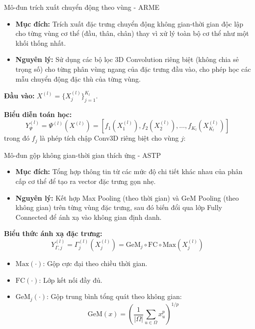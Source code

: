 \begin{frame}{Mô-đun trích xuất chuyển động theo vùng - ARME}
    \begin{itemize}
        \item \textbf{Mục đích:} Trích xuất đặc trưng chuyển động không gian-thời gian độc lập cho từng vùng cơ thể (đầu, thân, chân) thay vì xử lý toàn bộ cơ thể như một khối thống nhất.
        \item \textbf{Nguyên lý:} Sử dụng các bộ lọc 3D Convolution riêng biệt (không chia sẻ trọng số) cho từng phân vùng ngang của đặc trưng đầu vào, cho phép học các mẫu chuyển động đặc thù của từng vùng.
    \end{itemize}

    \textbf{Đầu vào:} $X^{(l)} = \{X_{j}^{(l)}\}_{j=1}^{K_l}$.

    \textbf{Biểu diễn toán học:}
    \begin{equation}
        Y^{(l)}_{\Psi}=\Psi^{(l)}(X^{(l)})=\left[f_{1}(X_{1}^{(l)}), f_{2}(X_{2}^{(l)}) ,\ldots, f_{K_l}(X_{K_l}^{(l)}) \right]
    \end{equation}
    trong đó $f_j$ là phép tích chập Conv3D riêng biệt cho vùng $j$:

\end{frame}

\begin{frame}{Mô-đun gộp không gian-thời gian thích ứng - ASTP}
    \begin{itemize}
        \item \textbf{Mục đích:} Tổng hợp thông tin từ các mức độ chi tiết khác nhau của phân cấp cơ thể để tạo ra vector đặc trưng gọn nhẹ.
        \item \textbf{Nguyên lý:} Kết hợp Max Pooling (theo thời gian) và GeM Pooling (theo không gian) trên từng vùng đặc trưng, sau đó biến đổi qua lớp Fully Connected để ánh xạ vào không gian định danh.
    \end{itemize}

    \textbf{Biểu thức ánh xạ đặc trưng:}
    \begin{equation}
        Y_{\Gamma,j}^{(l)} = \Gamma_j^{(l)}(X_j^{(l)}) = \text{GeM}_j \circ \text{FC} \circ \text{Max}(X_j^{(l)})
    \end{equation}

    \begin{itemize}
        \item $\text{Max}(\cdot)$: Gộp cực đại theo chiều thời gian.
        \item $\text{FC}(\cdot)$: Lớp kết nối đầy đủ.
        \item $\text{GeM}_j(\cdot)$: Gộp trung bình tổng quát theo không gian:
              $$ \text{GeM}(x) = \left( \frac{1}{|\Omega|} \sum_{u \in \Omega} x_u^p \right)^{1/p} $$
    \end{itemize}
\end{frame}

